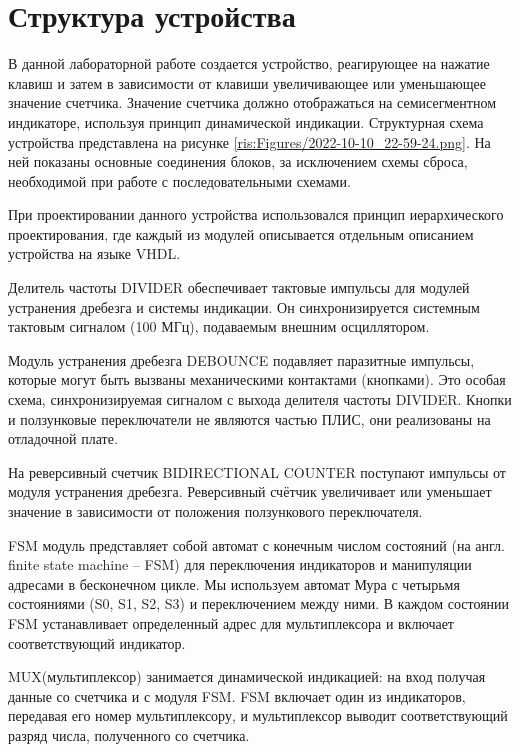 \begin{sloppypar} %
\newpage %

\section{Структура устройства} %
В данной лабораторной работе создается устройство, реагирующее на нажатие клавиш и затем в зависимости от клавиши увеличивающее или
уменьшающее значение счетчика. Значение счетчика должно отображаться на семисегментном индикаторе, используя принцип динамической индикации. Структурная схема устройства представлена на рисунке \ref{ris:Figures/2022-10-10_22-59-24.png}. На ней показаны основные соединения блоков, за исключением схемы сброса, необходимой при работе с последовательными схемами.




При проектировании данного устройства использовался принцип иерархического проектирования, где каждый из модулей описывается отдельным описанием устройства на языке VHDL. 

Делитель частоты DIVIDER обеспечивает тактовые импульсы для модулей устранения дребезга и системы индикации. Он синхронизируется системным тактовым сигналом (100 МГц), подаваемым внешним осциллятором. 


Модуль устранения дребезга DEBOUNCE подавляет паразитные импульсы, которые могут быть вызваны механическими контактами (кнопками). Это особая схема, синхронизируемая сигналом с выхода делителя частоты DIVIDER. Кнопки и ползунковые переключатели не являются частью ПЛИС, они реализованы на отладочной плате.  


На реверсивный счетчик BIDIRECTIONAL COUNTER поступают импульсы от модуля устранения дребезга. Реверсивный счётчик увеличивает или уменьшает значение в зависимости от положения ползункового переключателя.

FSM модуль представляет собой автомат с конечным числом состояний (на англ. finite state machine – FSM) для переключения индикаторов и манипуляции адресами в бесконечном цикле. Мы используем автомат Мура с четырьмя состояниями (S0, S1, S2, S3) и переключением между ними. В каждом состоянии FSM устанавливает определенный адрес для мультиплексора и включает соответствующий индикатор. 

MUX(мультиплексор) занимается динамической индикацией: на вход получая данные со счетчика и с модуля FSM. FSM включает один из индикаторов, передавая его номер мультиплексору, и мультиплексор выводит соответствующий разряд числа, полученного со счетчика.



\end{sloppypar}
